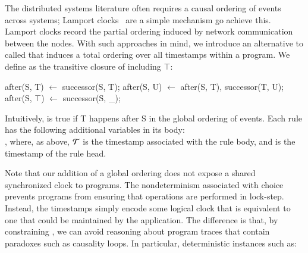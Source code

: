 
The distributed systems literature often requires a causal ordering
of events across systems; Lamport clocks~\cite{lamportclock} are a simple mechanism go achieve this.  Lamport clocks
record the partial ordering induced by network communication between
the nodes.  With such approaches in mind, we introduce an alternative
to  called  that induces a total
ordering over all timestamps within a \lang program.  We define  as the transitive closure of  including $\top$:

\begin{Dedalus}
after(S, T) \(\leftarrow\) successor(S, T);
after(S, U) \(\leftarrow\) after(S, T), successor(T, U);
after(S, \(\top\)) \(\leftarrow\) successor(S, _);
\end{Dedalus}

Intuitively,  is true if T happens after S in the
global ordering of events.  Each rule  has the
following additional variables in its body:
 \\
, where, as
above, $\Tau$ is the timestamp associated with the rule body, and
 is the timestamp of the rule head.

Note that our addition of a global ordering does not expose a shared
synchronized clock to \lang programs.  The nondeterminism associated with
choice prevents programs from ensuring that operations are performed in
lock-step.  Instead, the timestamps simply encode some logical clock that is
equivalent to one that could be maintained by the application.  The difference
is that, by constraining , we can avoid reasoning about program
traces that contain paradoxes such as causality loops.  In particular,
deterministic instances such as:

